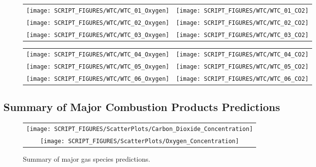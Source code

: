 \begin{figure}[h!]
\begin{tabular*}{\textwidth}{l@{\extracolsep{\fill}}r}
\texttt{[image: SCRIPT\_FIGURES/WTC/WTC\_01\_Oxygen]} &
\texttt{[image: SCRIPT\_FIGURES/WTC/WTC\_01\_CO2]} \\
\texttt{[image: SCRIPT\_FIGURES/WTC/WTC\_02\_Oxygen]} &
\texttt{[image: SCRIPT\_FIGURES/WTC/WTC\_02\_CO2]} \\
\texttt{[image: SCRIPT\_FIGURES/WTC/WTC\_03\_Oxygen]} &
\texttt{[image: SCRIPT\_FIGURES/WTC/WTC\_03\_CO2]}
\end{tabular*}
\label{NIST_WTC_Oxygen_CO2_1}
\end{figure}

\newpage

\begin{figure}[p]
\begin{tabular*}{\textwidth}{l@{\extracolsep{\fill}}r}
\texttt{[image: SCRIPT\_FIGURES/WTC/WTC\_04\_Oxygen]} &
\texttt{[image: SCRIPT\_FIGURES/WTC/WTC\_04\_CO2]} \\
\texttt{[image: SCRIPT\_FIGURES/WTC/WTC\_05\_Oxygen]} &
\texttt{[image: SCRIPT\_FIGURES/WTC/WTC\_05\_CO2]} \\
\texttt{[image: SCRIPT\_FIGURES/WTC/WTC\_06\_Oxygen]} &
\texttt{[image: SCRIPT\_FIGURES/WTC/WTC\_06\_CO2]}
\end{tabular*}
\label{NIST_WTC_Oxygen_CO2_2}
\end{figure}

\clearpage


\subsection{Summary of Major Combustion Products Predictions}


\begin{figure}[h!]
\begin{center}
\begin{tabular}{c}
\texttt{[image: SCRIPT\_FIGURES/ScatterPlots/Carbon\_Dioxide\_Concentration]} \\
\texttt{[image: SCRIPT\_FIGURES/ScatterPlots/Oxygen\_Concentration]}\\
\end{tabular}
\end{center}
\caption[Summary of major gas species predictions]
{Summary of major gas species predictions.}
\end{figure}

